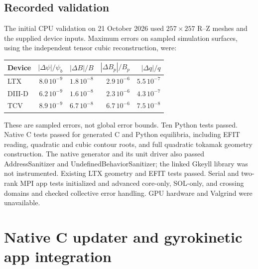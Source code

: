 \documentclass[11pt]{article}
\begin{document}
\subsection{Recorded validation}
The initial CPU validation on 21 October 2026 used $257\times257$ R--Z
meshes and the supplied device inputs. Maximum errors on sampled simulation
surfaces, using the independent tensor cubic reconstruction, were:
\begin{center}
\begin{tabular}{lrrrr}
Device & $|\Delta\psi|/\psi_b$ & $|\Delta B|/B$ & $|\Delta B_p|/B_p$
       & $|\Delta q|/q$ \\
\hline
LTX   & $8.0\,10^{-9}$ & $1.8\,10^{-8}$ & $2.9\,10^{-6}$ & $5.5\,10^{-7}$ \\
DIII-D & $6.2\,10^{-9}$ & $1.6\,10^{-8}$ & $2.3\,10^{-6}$ & $4.3\,10^{-7}$ \\
TCV   & $8.9\,10^{-9}$ & $6.7\,10^{-8}$ & $6.7\,10^{-6}$ & $7.5\,10^{-8}$ \\
\end{tabular}
\end{center}
These are sampled errors, not global error bounds. Ten Python tests passed.
Native C tests passed for generated C and Python equilibria, including EFIT
reading, quadratic and cubic contour roots, and full quadratic tokamak geometry
construction. The native generator and its unit driver also passed AddressSanitizer
and UndefinedBehaviorSanitizer; the linked Gkeyll library was not instrumented.
Existing LTX geometry and EFIT tests passed. Serial and two-rank MPI app tests
initialized and advanced core-only, SOL-only, and crossing domains and checked
collective error handling. GPU hardware and Valgrind were unavailable.

\section{Native C updater and gyrokinetic app integration}
\end{document}
